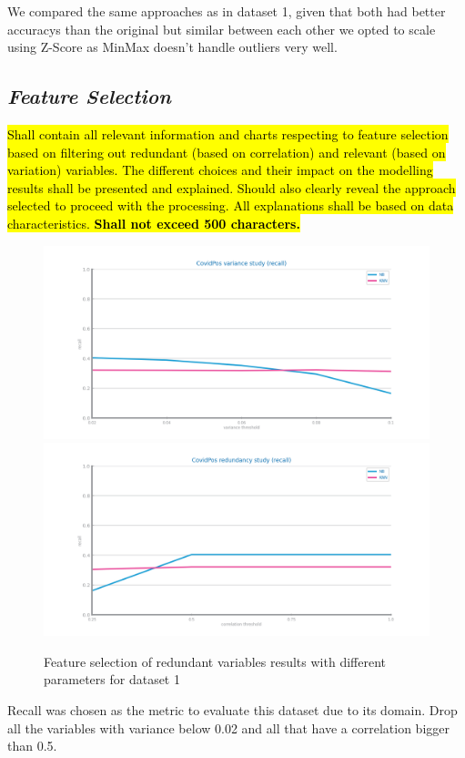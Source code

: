 \documentclass[10pt]{extarticle}
\newcommand{\ctext}[3][RGB]{%
  \begingroup
  \definecolor{hlcolor}{#1}{#2}\sethlcolor{hlcolor}%
  \hl{#3}%
  \endgroup
}
\begin{document}
We compared the same approaches as in dataset 1, given that both had better accuracys than the original but similar between 
each other we opted to scale using Z-Score as MinMax doesn't handle outliers very well.  

\subsection*{\textit{Feature Selection}}
\ctext[RGB]{190,190,190}{Shall contain all relevant information and charts respecting to feature selection based on filtering out redundant (based on correlation) and relevant (based on variation) variables. The different choices and their impact on the modelling results shall be presented and explained. Should also clearly reveal the approach selected to proceed with the processing. All explanations shall be based on data characteristics.  \textbf{Shall not exceed 500 characters.}}

\begin{figure}[H]
\centering\includegraphics[scale=0.40]{images/dataset1/data_preparation/CovidPos_fs_low_var_recall_study.png}
\includegraphics[scale=0.40]{images/dataset1/data_preparation/CovidPos_fs_redundancy_recall_study.png}
\caption{Feature selection of redundant variables results with different parameters for dataset 1}
\end{figure}
Recall was chosen as the metric to evaluate this dataset due to its domain.
Drop all the variables with variance below 0.02 and all that have a correlation bigger than 0.5.
\end{document}
